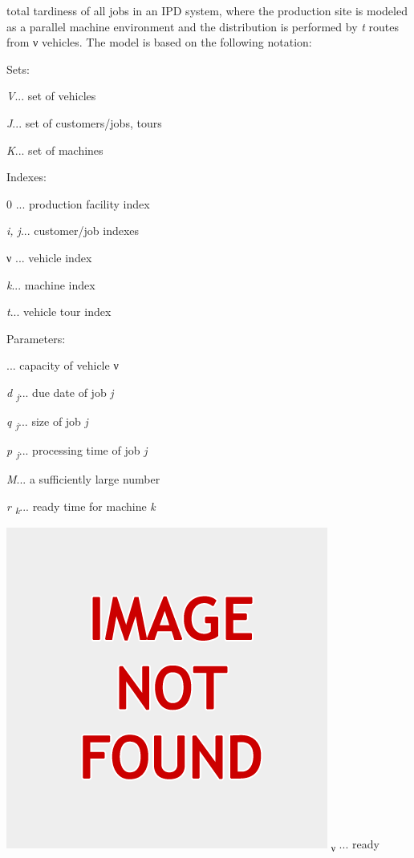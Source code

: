  total tardiness of all jobs in an IPD system, where the production site is modeled as
 a parallel machine environment and the distribution is performed by \textit{t
 } routes from ν vehicles. The model is based on the following notation:\par Sets:\par \textit{V}... set of vehicles\par \textit{J}... set of customers/jobs, tours\par \textit{K}... set of machines\par Indexes:\par 0 ... production facility index\par \textit{i, j}... customer/job indexes\par ν ... vehicle index\par \textit{k}... machine index\par \textit{t}... vehicle tour index\par Parameters:\par  ... capacity of vehicle ν\par \textit{d \textsubscript{j}}... due date of job \textit{j}\par \textit{q \textsubscript{j}}... size of job \textit{j}\par \textit{p \textsubscript{j}}... processing time of job \textit{j}\par \textit{M}... a sufficiently large number\par \textit{r \textsubscript{k}}... ready time for machine \textit{k}\par 
{
\centering
\includegraphics[width=\maxwidth{0.5\textwidth}]{not-found.png}
} \textsubscript{ν} ... ready
